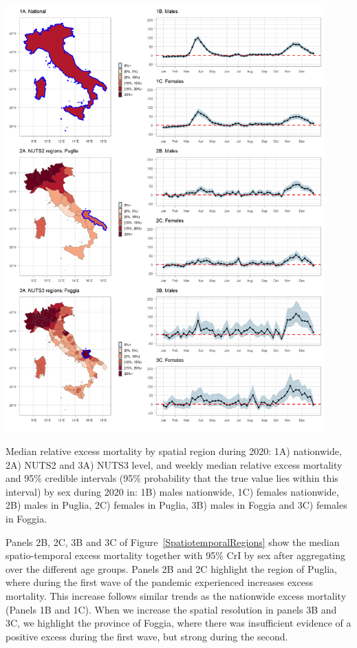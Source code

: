 \begin{widefigure}[H]
	\centering
	\includegraphics[width=0.92\textwidth]{SpatiotemporalRegions.png}
	\caption{Median relative excess mortality by spatial region during 2020: 1A) nationwide, 2A) NUTS2 and 3A) NUTS3 level, and weekly median relative excess mortality and 95\% credible intervals (95\% probability that the true value lies within this interval) by sex during 2020 in: 1B) males nationwide, 1C) females nationwide, 2B) males in Puglia, 2C) females in Puglia, 3B) males in Foggia and 3C) females in Foggia.}
	\label{SpatiotemporalRegions}
\end{widefigure}	

Panels 2B, 2C, 3B and 3C of Figure~\ref{SpatiotemporalRegions} show the median spatio-temporal excess mortality together with 95\% CrI by sex after aggregating over the different age groups. Panels 2B and 2C highlight the region of Puglia, where during the first wave of the pandemic experienced increases excess mortality. This increase follows similar trends as the nationwide excess mortality (Panels 1B and 1C). When we increase the spatial resolution in panels 3B and 3C, we highlight the province of Foggia, where there was insufficient evidence of a positive excess during the first wave, but strong during the second.

